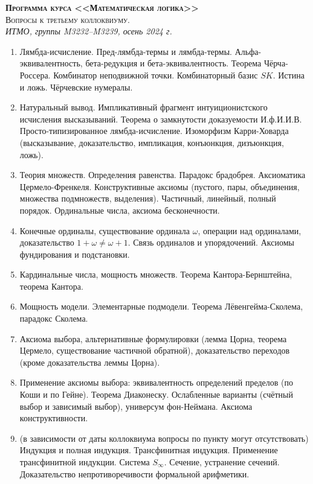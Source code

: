 \documentclass[11pt,a4paper,oneside]{scrartcl}
\begin{document}
\pagestyle{empty}

\begin{center}
{\large\scshape\bfseries Программа курса <<Математическая логика>>}\\
{\large\scshape Вопросы к третьему коллоквиуму.}\\
\itshape ИТМО, группы M3232--M3239, осень 2024 г.
\end{center}


\begin{enumerate}
\item Лямбда-исчисление. Пред-лямбда-термы и лямбда-термы. Альфа-эквивалентность, бета-редукция
и бета-эквивалентность. Теорема Чёрча-Россера. 
Комбинатор неподвижной точки. Комбинаторный базис $SK$.
Истина и ложь. Чёрчевские нумералы. 
\item Натуральный вывод. Импликативный фрагмент интуиционистского исчисления высказываний.
Теорема о замкнутости доказуемости И.ф.И.И.В.
Просто-типизированное лямбда-исчисление. Изоморфизм Карри-Ховарда 
(высказывание, доказательство, импликация, конъюнкция, дизъюнкция, ложь). 
\item Теория множеств. Определения равенства. Парадокс брадобрея. Аксиоматика Цермело-Френкеля. 
Конструктивные аксиомы
(пустого, пары, объединения, множества подмножеств, выделения).
Частичный, линейный, полный порядок. Ординальные числа, аксиома бесконечности. 
\item Конечные ординалы, существование ординала $\omega$, операции над ординалами, 
доказательство $1+\omega\ne\omega+1$. Связь ординалов и упорядочений. Аксиомы фундирования и подстановки.
\item Кардинальные числа, мощность множеств. Теорема Кантора-Бернштейна, теорема Кантора. 
\item Мощность модели. Элементарные подмодели. Теорема Лёвенгейма-Сколема, парадокс Сколема.
\item Аксиома выбора, альтернативные формулировки (лемма Цорна, теорема Цермело, существование
частичной обратной), доказательство переходов (кроме доказательства леммы Цорна).
\item Применение аксиомы выбора: эквивалентность определений пределов (по Коши и по Гейне).
Теорема Диаконеску. Ослабленные варианты (счётный выбор и зависимый выбор), универсум фон-Неймана.
Аксиома конструктивности.
\item 
(в зависимости от даты коллоквиума вопросы по пункту могут отсутствовать)
Индукция и полная индукция. Трансфинитная индукция. Применение трансфинитной индукции.
Система $S_\infty$. 
Сечение, устранение сечений. Доказательство непротиворечивости формальной арифметики.
\end{enumerate}
\end{document}
